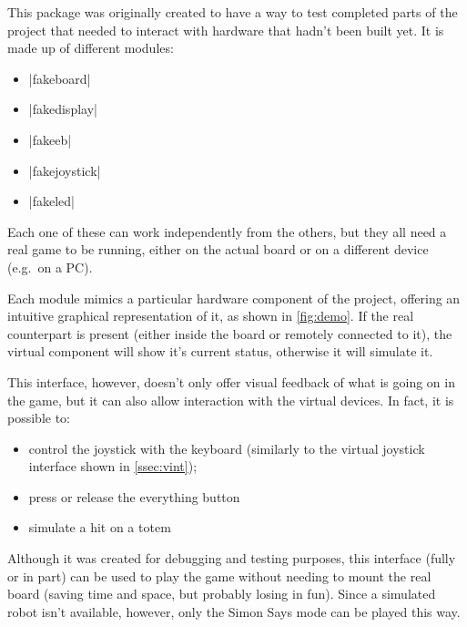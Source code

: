 \beforelist* This package was originally created to have a way to test completed
parts of the project that needed to interact with hardware that hadn't been
built yet.
It is made up of different modules:
\begin{multicols}{2}
\begin{itemize}
  \item \Code|fakeboard|
  \item \Code|fakedisplay|
  \item \Code|fakeeb|
  \item \Code|fakejoystick|
  \item \Code|fakeled|
\end{itemize}
\end{multicols}
\afterlist
Each one of these can work independently from the others, but they all need a
real game to be running, either on the actual board or on a different device
(e.g.\ on a PC).

Each module mimics a particular hardware component of the project, offering an
intuitive graphical representation of it, as shown in \autoref{fig:demo}. If the
real counterpart is present (either inside the board or remotely connected to
it), the virtual component will show it's current status, otherwise it will
simulate it.

\beforelist* This interface, however, doesn't only offer visual feedback of what
is going on in the game, but it can also allow interaction with the virtual
devices.
In fact, it is possible to:
\begin{itemize}
  \item control the joystick with the keyboard (similarly to the virtual
    joystick interface shown in \autoref{ssec:vint});
  \item press or release the everything button
  \item simulate a hit on a totem
\end{itemize}
\afterlist*
Although it was created for debugging and testing purposes, this interface
(fully or in part) can be used to play the game without needing to mount the
real board (saving time and space, but probably losing in fun).
Since a simulated robot isn't available, however, only the Simon Says mode can
be played this way.

